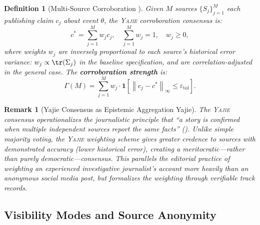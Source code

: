 \documentclass[11pt,a4paper]{article}
\newtheorem{definition}[theorem]{Definition}
\newtheorem{remark}[theorem]{Remark}
\theoremstyle{definition}
\newcommand{\Yajie}{\textsc{Yajie}}
\newcommand{\ind}[1]{\mathbf{1}[#1]}
\newcommand{\norm}[1]{\left\lVert#1\right\rVert}
\begin{document}
\begin{definition}[Multi-Source Corroboration ]
\label{def:corroboration}
Given $M$ sources $\{S_j\}_{j=1}^{M}$ each publishing claim $c_j$ about event $\theta$, the \Yajie{} corroboration consensus is:
\begin{equation}
    c^* = \sum_{j=1}^{M} w_j c_j, \quad \sum_{j=1}^{M} w_j = 1, \quad w_j \geq 0,
    \label{eq:corroboration_consensus}
\end{equation}
where weights $w_j$ are inversely proportional to each source's historical error variance: $w_j \propto \tr(\Sigma_j)$ in the baseline specification, and are correlation-adjusted in the general case. The \textbf{corroboration strength} is:
\begin{equation}
    \Gamma(M) = \sum_{j=1}^{M} w_j \cdot \ind{\norm{c_j - c^*}_\infty \leq \varepsilon_{\mathrm{tol}}}.
    \label{eq:corroboration_strength}
\end{equation}
\end{definition}

\begin{remark}[Yajie Consensus as Epistemic Aggregation Yajie]
The \Yajie{} consensus operationalizes the journalistic principle that ``a story is confirmed when multiple independent sources report the same facts'' (). Unlike simple majority voting, the \Yajie{} weighting scheme gives greater credence to sources with demonstrated accuracy (lower historical error), creating a meritocratic---rather than purely democratic---consensus. This parallels the editorial practice of weighting an experienced investigative journalist's account more heavily than an anonymous social media post, but formalizes the weighting through verifiable track records.
\end{remark}

\subsection{Visibility Modes and Source Anonymity }
\end{document}

